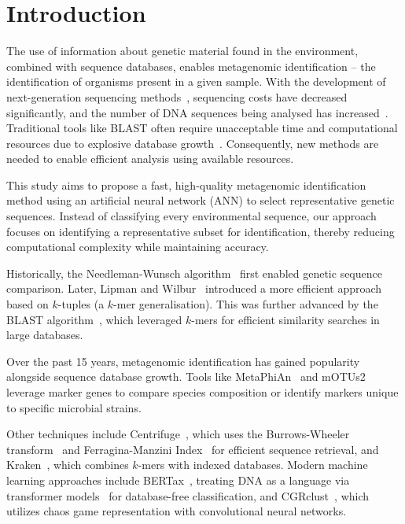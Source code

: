 \documentclass[biomedinformatics,article,submit,moreauthors]{Definitions/mdpi}
\begin{document}
\section{Introduction}
    The use of information about genetic material found in the environment, combined with sequence databases, enables metagenomic identification -- the identification of organisms present in a given sample. With the development of next-generation sequencing methods~\citep{Reinartz:2002}, sequencing costs have decreased significantly, and the number of DNA sequences being analysed has increased~\citep{Muir:2016}. Traditional tools like BLAST often require unacceptable time and computational resources due to explosive database growth~\citep{10.1093/nar/gkr854}. Consequently, new methods are needed to enable efficient analysis using available resources.

    This study aims to propose a fast, high-quality metagenomic identification method using an artificial neural network (ANN) to select representative genetic sequences. Instead of classifying every environmental sequence, our approach focuses on identifying a representative subset for identification, thereby reducing computational complexity while maintaining accuracy.

    Historically, the Needleman-Wunsch algorithm~\citep{Needleman:1970} first enabled genetic sequence comparison. Later, Lipman and Wilbur~\citep{Wilbur:1983} introduced a more efficient approach based on $k$-tuples (a $k$-mer generalisation). This was further advanced by the BLAST algorithm~\citep{Altschul:1990}, which leveraged $k$-mers for efficient similarity searches in large databases.

    Over the past 15 years, metagenomic identification has gained popularity alongside sequence database growth. Tools like MetaPhiAn~\citep{Segata:2012} and mOTUs2~\citep{Milanese:2019} leverage marker genes to compare species composition or identify markers unique to specific microbial strains.

    Other techniques include Centrifuge~\citep{Kim:2016}, which uses the Burrows-Wheeler transform~\citep{Burrows:1994} and Ferragina-Manzini Index~\citep{Ferragina:2000} for efficient sequence retrieval, and Kraken~\citep{Wood:2014}, which combines $k$-mers with indexed databases. Modern machine learning approaches include BERTax~\citep{Mock:2022}, treating DNA as a language via transformer models~\citep{Transformers} for database-free classification, and CGRclust~\citep{Alipour:2024}, which utilizes chaos game representation with convolutional neural networks.
\end{document}
